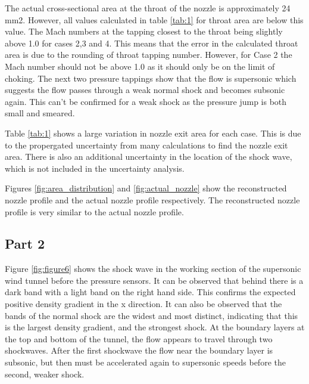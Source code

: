 \documentclass{article}
\begin{document}


The actual cross-sectional area at the throat of the nozzle is approximately 24 mm2.
However, all values calculated in table \ref{tab:1} for throat area are below this value.
The Mach numbers at the tapping closest to the throat being slightly above 1.0 for cases 2,3 and 4.
This means that the error in the calculated throat area is due to the rounding of throat tapping number.
However, for Case 2 the Mach number should not be above 1.0 as it should only be on the limit of choking.
The next two pressure tappings show that the flow is supersonic which suggests the flow passes through a weak normal shock and becomes subsonic again.
This can't be confirmed for a weak shock as the pressure jump is both small and smeared.

Table \ref{tab:1} shows a large variation in nozzle exit area for each case.
This is due to the propergated uncertainty from many calculations to find the nozzle exit area.
There is also an additional uncertainty in the location of the shock wave, which is not included in the uncertainty analysis.

Figures \ref{fig:area_distribution} and \ref{fig:actual_nozzle} show the reconstructed nozzle profile and the actual nozzle profile respectively.
The reconstructed nozzle profile is very similar to the actual nozzle profile.



\subsection{Part 2}

Figure \ref{fig:figure6} shows the shock wave in the working section of the supersonic wind tunnel before the pressure sensors.
It can be observed that behind there is a dark band with a light band on the right hand side.
This confirms the expected positive density gradient in the x direction.
It can also be observed that the bands of the normal shock are the widest and most distinct, indicating that this is the largest density gradient, and the strongest shock.
At the boundary layers at the top and bottom of the tunnel, the flow appears to travel through two shockwaves.
After the first shockwave the flow near the boundary layer is subsonic, but then must be accelerated again to supersonic speeds before the second, weaker shock.
\end{document}
